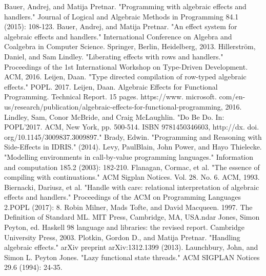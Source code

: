\documentclass[12pt]{book}
\begin{document}
\newpage
\begin{thebibliography}{9}
Bauer, Andrej, and Matija Pretnar. "Programming with algebraic effects and handlers." Journal of Logical and Algebraic Methods in Programming 84.1 (2015): 108-123.
Bauer, Andrej, and Matija Pretnar. "An effect system for algebraic effects and handlers." International Conference on Algebra and Coalgebra in Computer Science. Springer, Berlin, Heidelberg, 2013.
Hillerstr\"{o}m, Daniel, and Sam Lindley. "Liberating effects with rows and handlers." Proceedings of the 1st International Workshop on Type-Driven Development. ACM, 2016.
Leijen, Daan. "Type directed compilation of row-typed algebraic effects." POPL. 2017.
Leijen, Daan. Algebraic Effects for Functional Programming. Technical Report. 15 pages. https://www. microsoft. com/en-us/research/publication/algebraic-effects-for-functional-programming, 2016.
Lindley, Sam, Conor McBride, and Craig McLaughlin. "Do Be Do. In: POPL'2017. ACM, New York, pp. 500-514. ISBN 9781450346603, http://dx. doi. org/10.1145/3009837.3009897."
Brady, Edwin. "Programming and Reasoning with Side-Effects in IDRIS." (2014).
Levy, PaulBlain, John Power, and Hayo Thielecke. "Modelling environments in call-by-value programming languages." Information and computation 185.2 (2003): 182-210.
Flanagan, Cormac, et al. "The essence of compiling with continuations." ACM Sigplan Notices. Vol. 28. No. 6. ACM, 1993.
Biernacki, Dariusz, et al. "Handle with care: relational interpretation of algebraic effects and handlers." Proceedings of the ACM on Programming Languages 2.POPL (2017): 8.
Robin Milner, Mads Tofte, and David Macqueen. 1997. The Definition of Standard ML. MIT Press, Cambridge, MA, USA.ndar
Jones, Simon Peyton, ed. Haskell 98 language and libraries: the revised report. Cambridge University Press, 2003.
Plotkin, Gordon D., and Matija Pretnar. "Handling algebraic effects." arXiv preprint arXiv:1312.1399 (2013).
Launchbury, John, and Simon L. Peyton Jones. "Lazy functional state threads." ACM SIGPLAN Notices 29.6 (1994): 24-35.
\end{thebibliography}
\end{document}
